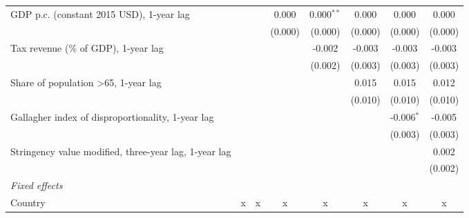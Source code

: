 \begin{table}[htbp]
\begin{tabular}{lccccccc}
      GDP p.c. (constant 2015 USD), 1-year lag                                      &              &              & 0.000         & 0.000$^{**}$ & 0.000          & 0.000          & 0.000\\   
                                                                                    &              &              & (0.000)       & (0.000)      & (0.000)        & (0.000)        & (0.000)\\   
      Tax revenue (\% of GDP), 1-year lag                                           &              &              &               & -0.002       & -0.003         & -0.003         & -0.003\\   
                                                                                    &              &              &               & (0.002)      & (0.003)        & (0.003)        & (0.003)\\   
      Share of population >65, 1-year lag                                           &              &              &               &              & 0.015          & 0.015          & 0.012\\   
                                                                                    &              &              &               &              & (0.010)        & (0.010)        & (0.010)\\   
      Gallagher index of disproportionality, 1-year lag                             &              &              &               &              &                & -0.006$^{*}$   & -0.005\\   
                                                                                    &              &              &               &              &                & (0.003)        & (0.003)\\   
      Stringency value modified, three-year lag, 1-year lag                         &              &              &               &              &                &                & 0.002\\   
                                                                                    &              &              &               &              &                &                & (0.002)\\   
      \emph{Fixed effects}\\
      Country                                                                       & x            & x            & x             & x            & x              & x              & x\\  

\end{tabular}
\end{table}
